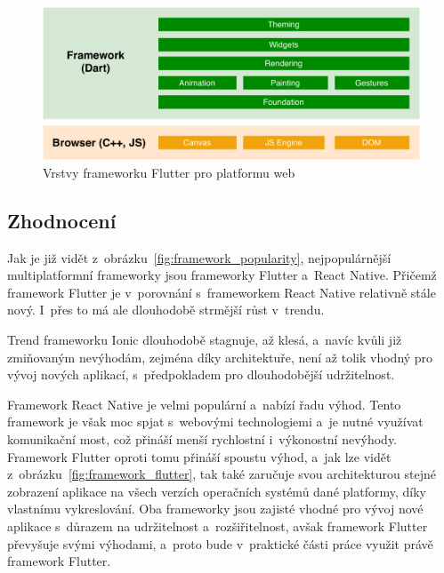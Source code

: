 \begin{figure}
    \centering
    \includegraphics[width=\linewidth]{assets/technology-research/framework/flutter_overview_web.pdf}
    \caption{Vrstvy frameworku Flutter pro platformu web~\cite{flutter_web}}
    \label{fig:flutter_layers_web}
\end{figure}

\subsection{Zhodnocení}

Jak je již vidět z~obrázku~\ref{fig:framework_popularity},
nejpopulárnější multiplatformní frameworky jsou frameworky Flutter
a~React Native.
Přičemž framework Flutter je v~porovnání s~frameworkem React Native relativně
stále nový.
I~přes to má ale dlouhodobě strmější růst v~trendu.

Trend frameworku Ionic dlouhodobě stagnuje, až klesá,
a~navíc kvůli již zmiňovaným nevýhodám,
zejména díky architektuře,
není až tolik vhodný pro vývoj nových aplikací,
s~předpokladem pro dlouhodobější udržitelnost. 

Framework React Native je velmi populární a~nabízí řadu výhod.
Tento framework je však moc spjat s~webovými technologiemi
a~je nutné využívat komunikační most,
což přináší menší rychlostní i~výkonostní nevýhody.
Framework Flutter oproti tomu přináší spoustu výhod,
a~jak lze vidět z~obrázku~\ref{fig:framework_flutter},
tak také zaručuje svou architekturou stejné zobrazení aplikace na všech
verzích operačních systémů dané platformy,
díky vlastnímu vykreslování.
Oba frameworky jsou zajisté vhodné pro vývoj nové aplikace s~důrazem na
udržitelnost a~rozšiřitelnost,
avšak framework Flutter převyšuje svými výhodami,
a~proto bude v~praktické části práce využit právě framework Flutter.
